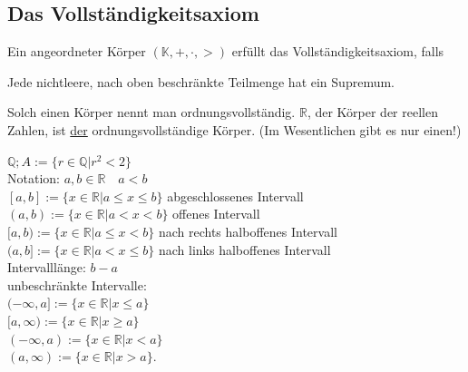 \documentclass[../ana1.tex]{subfiles}
\begin{document}
				\subsection{Das Vollständigkeitsaxiom}
				\begin{defi}
					Ein angeordneter Körper $(\mathbb{K},+,\cdot,>)$ erfüllt das Vollständigkeitsaxiom, falls\\
					\begin{center}
						Jede nichtleere, nach oben beschränkte Teilmenge hat ein Supremum.
					\end{center}
					Solch einen Körper nennt man ordnungsvollständig. $\mathbb{R}$, der Körper der reellen Zahlen, ist \underline{der} ordnungsvollständige Körper. (Im Wesentlichen gibt es nur einen!)
				\end{defi}
			$\mathbb{Q}; A:= \{r\in\mathbb{Q}|r^2 < 2\}$\\
				Notation: $a,b\in\mathbb{R} \quad a<b$\\
			$[a,b] := \{x\in\mathbb{R}|a\leq x\leq b\}$ abgeschlossenes Intervall\\
			$(a,b) := \{x\in\mathbb{R} | a<x<b\}$ offenes Intervall\\
			$[a,b) := \{x\in\mathbb{R}|a\leq x<b\}$ nach rechts halboffenes Intervall\\
					$(a,b] := \{x\in\mathbb{R}|a<x\leq b\}$ nach links halboffenes Intervall\\
				Intervalllänge: $b-a$\\
				unbeschränkte Intervalle:\\
			$(-\infty, a] := \{x\in\mathbb{R}|x\leq a\}$\\
$[a,\infty) := \{x\in\mathbb{R}|x\geq a\}$\\
$(-\infty, a) := \{x\in\mathbb{R}|x<a\}$\\
$(a, \infty) := \{x\in\mathbb{R}|x>a\}$.
\end{document}
